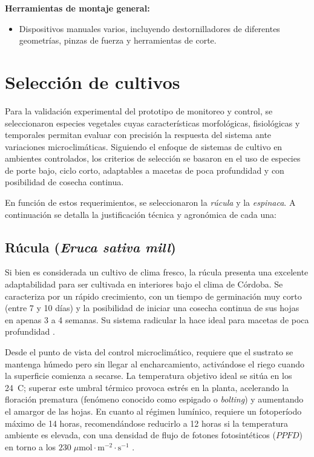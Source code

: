 \textbf{Herramientas de montaje general:}
\begin{itemize}
    \item Dispositivos manuales varios, incluyendo destornilladores de diferentes geometrías, pinzas de fuerza y herramientas de corte.
\end{itemize}

\section{Selección de cultivos}
\label{sec:seleccion_cultivos}
Para la validación experimental del prototipo de monitoreo y control, se seleccionaron especies vegetales cuyas características morfológicas, fisiológicas y temporales permitan evaluar con precisión la respuesta del sistema ante variaciones microclimáticas. Siguiendo el enfoque de sistemas de cultivo en ambientes controlados, los criterios de selección se basaron en el uso de especies de porte bajo, ciclo corto, adaptables a macetas de poca profundidad y con posibilidad de cosecha continua.

En función de estos requerimientos, se seleccionaron la \textit{rúcula} y la \textit{espinaca}. A continuación se detalla la justificación técnica y agronómica de cada una:

\subsection{Rúcula (\textit{Eruca sativa mill})}
Si bien es considerada un cultivo de clima fresco, la rúcula presenta una excelente adaptabilidad para ser cultivada en interiores bajo el clima de Córdoba. Se caracteriza por un rápido crecimiento, con un tiempo de germinación muy corto (entre 7 y 10 días) y la posibilidad de iniciar una cosecha continua de sus hojas en apenas 3 a 4 semanas. Su sistema radicular la hace ideal para macetas de poca profundidad \cite{guia_rucula_indoors}.

Desde el punto de vista del control microclimático, requiere que el sustrato se mantenga húmedo pero sin llegar al encharcamiento, activándose el riego cuando la superficie comienza a secarse. La temperatura objetivo ideal se sitúa en los 24~\textdegree C; superar este umbral térmico provoca estrés en la planta, acelerando la floración prematura (fenómeno conocido como espigado o \textit{bolting}) y aumentando el amargor de las hojas. En cuanto al régimen lumínico, requiere un fotoperíodo máximo de 14 horas, recomendándose reducirlo a 12 horas si la temperatura ambiente es elevada, con una densidad de flujo de fotones fotosintéticos ($PPFD$) en torno a los $230 \;\mu\text{mol}\cdot\text{m}^{-2}\cdot\text{s}^{-1}$ \cite{rucula_mdpi}.

